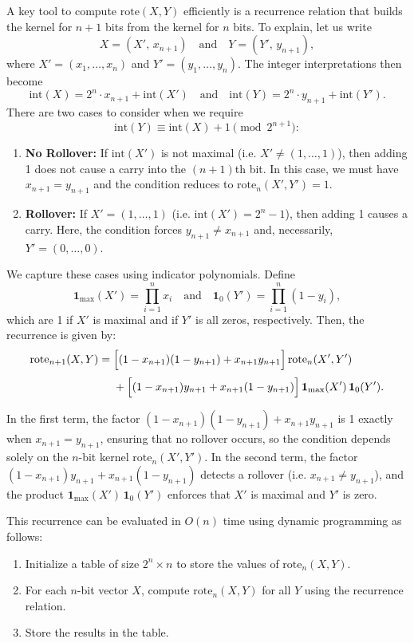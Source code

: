 \documentclass{article}
\begin{document}
A key tool to compute \(\text{rote}(X,Y)\) efficiently is a recurrence relation that builds the kernel for \(n+1\) bits from the kernel for \(n\) bits. To explain, let us write 
\[
X=(X',\,x_{n+1})\quad \text{and}\quad Y=(Y',\,y_{n+1}),
\]
where \(X'=(x_1,\dots,x_n)\) and \(Y'=(y_1,\dots,y_n)\). The integer interpretations then become
\[
\text{int}(X)=2^n \cdot x_{n+1}+\text{int}(X')\quad \text{and}\quad \text{int}(Y)=2^n \cdot y_{n+1}+\text{int}(Y').
\]
There are two cases to consider when we require
\[
\text{int}(Y) \equiv \text{int}(X)+1 \pmod{2^{n+1}}:
\]
\begin{enumerate}
    \item \textbf{No Rollover:} If \(\text{int}(X')\) is not maximal (i.e. \(X' \neq (1,\dots,1)\)), then adding 1 does not cause a carry into the \((n+1)\)th bit. In this case, we must have \(x_{n+1}=y_{n+1}\) and the condition reduces to \(\text{rote}_n(X',Y')=1\).
    \item \textbf{Rollover:} If \(X'=(1,\dots,1)\) (i.e. \(\text{int}(X')=2^n-1\)), then adding 1 causes a carry. Here, the condition forces \(y_{n+1}\neq x_{n+1}\) and, necessarily, \(Y'=(0,\dots,0)\).
\end{enumerate}
We capture these cases using indicator polynomials. Define
\[
\mathbf{1}_{\max}(X') = \prod_{i=1}^n x_i \quad \text{and} \quad \mathbf{1}_{0}(Y') = \prod_{i=1}^n (1-y_i),
\]
which are 1 if \(X'\) is maximal and if \(Y'\) is all zeros, respectively. Then, the recurrence is given by:
\[
\begin{aligned}
\text{rote}_{n+1}(X,Y) =\; &\Bigl[(1-x_{n+1})(1-y_{n+1}) + x_{n+1}y_{n+1}\Bigr]\,\text{rote}_n(X',Y')\\[1mm]
&+ \Bigl[(1-x_{n+1})y_{n+1} + x_{n+1}(1-y_{n+1})\Bigr]\,\mathbf{1}_{\max}(X')\,\mathbf{1}_{0}(Y').
\end{aligned}
\]

In the first term, the factor \((1-x_{n+1})(1-y_{n+1}) + x_{n+1}y_{n+1}\) is 1 exactly when \(x_{n+1}=y_{n+1}\), ensuring that no rollover occurs, so the condition depends solely on the \(n\)-bit kernel \(\text{rote}_n(X',Y')\). In the second term, the factor \((1-x_{n+1})y_{n+1} + x_{n+1}(1-y_{n+1})\) detects a rollover (i.e. \(x_{n+1}\neq y_{n+1}\)), and the product \(\mathbf{1}_{\max}(X')\,\mathbf{1}_{0}(Y')\) enforces that \(X'\) is maximal and \(Y'\) is zero.

This recurrence can be evaluated in \(O(n)\) time using dynamic programming as follows:
\begin{enumerate}
    \item Initialize a table of size \(2^n \times n\) to store the values of \(\text{rote}_n(X,Y)\).
    \item For each \(n\)-bit vector \(X\), compute \(\text{rote}_n(X,Y)\) for all \(Y\) using the recurrence relation.
    \item Store the results in the table.
\end{enumerate}
\end{document}
